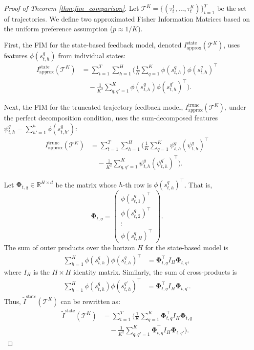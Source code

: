 \documentclass{article}
\newcommand{\bPhi}{\mathbf{\Phi}}
\begin{document}
\begin{proof}[Proof of Theorem \ref{thm:fim_comparison}]
Let $\mathcal{T}^K = \{ (\tau^1_t, \dots, \tau^K_t) \}_{t=1}^T$ be the set of trajectories.
We define two approximated Fisher Information Matrices based on the uniform preference assumption ($p \approx 1/K$).

First, the FIM for the state-based feedback model, denoted $I^{\text{state}}_{\text{approx}}(\mathcal{T}^K)$, uses features $\phi(s^q_{t,h})$ from individual states:
    \begin{align*}
    I^{\text{state}}_{\text{approx}}(\mathcal{T}^K)
    &= \sum_{t=1}^T \sum_{h=1}^H \Bigg( \frac{1}{K} \sum_{q=1}^K \phi(s^q_{t,h})\phi(s^q_{t,h})^\top \\
    &\quad - \frac{1}{K^2} \sum_{q,q'=1}^K \phi(s^q_{t,h})\phi(s^{q'}_{t,h})^\top \Bigg).
    \end{align*}

Next, the FIM for the truncated trajectory feedback model, $I^{\text{trunc}}_{\text{approx}}(\mathcal{T}^K)$, under the perfect decomposition condition, uses the sum-decomposed features $\psi^q_{t,h} = \sum_{h'=1}^h \phi(s^q_{t,h'})$:
    \begin{align*}
    I^{\text{trunc}}_{\text{approx}}(\mathcal{T}^K)
    &= \sum_{t=1}^T \sum_{h=1}^H \Bigg( \frac{1}{K} \sum_{q=1}^K \psi^q_{t,h}(\psi^q_{t,h})^\top \\
    &\quad - \frac{1}{K^2} \sum_{q,q'=1}^K \psi^q_{t,h}(\psi^{q'}_{t,h})^\top \Bigg).
    \end{align*}

Let $\bPhi_{t,q} \in \mathbb{R}^{H \times d}$ be the matrix whose $h$-th row is $\phi(s^q_{t,h})^\top$. That is,
\[ \bPhi_{t,q} = \begin{pmatrix} \phi(s^q_{t,1})^\top \\ \phi(s^q_{t,2})^\top \\ \vdots \\ \phi(s^q_{t,H})^\top \end{pmatrix}. \]
The sum of outer products over the horizon $H$ for the state-based model is
\begin{align*}
\sum_{h=1}^H \phi(s^q_{t,h})\phi(s^q_{t,h})^\top &= \bPhi_{t,q}^\top I_H \bPhi_{t,q},
\end{align*}
where $I_H$ is the $H \times H$ identity matrix. Similarly, the sum of cross-products is
\begin{align*}
\sum_{h=1}^H \phi(s^q_{t,h})\phi(s^{q'}_{t,h})^\top &= \bPhi_{t,q}^\top I_H \bPhi_{t,q'}.
\end{align*}
Thus, $\tilde{I}^{\text{state}}(\mathcal{T}^K)$ can be rewritten as:
\begin{align*}
\tilde{I}^{\text{state}}(\mathcal{T}^K)
&= \sum_{t=1}^T \Bigg( \frac{1}{K} \sum_{q=1}^K \bPhi_{t,q}^\top I_H \bPhi_{t,q} \\
&\quad - \frac{1}{K^2} \sum_{q,q'=1}^K \bPhi_{t,q}^\top I_H \bPhi_{t,q'} \Bigg).
\end{align*}


\end{proof}
\end{document}
